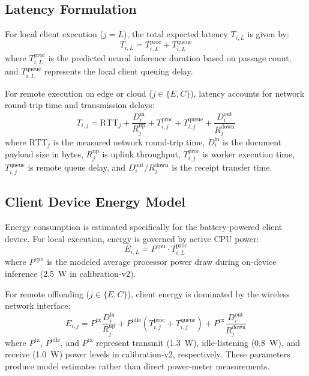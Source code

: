 \documentclass[conference]{IEEEtran}
\begin{document}
\subsection{Latency Formulation}
For local client execution ($j=L$), the total expected latency $T_{i,L}$ is given by:
\begin{equation}
  T_{i,L} = T^{\text{proc}}_{i,L} + T^{\text{queue}}_{i,L}
\end{equation}
where $T^{\text{proc}}_{i,L}$ is the predicted neural inference duration based on passage count, and $T^{\text{queue}}_{i,L}$ represents the local client queuing delay.

For remote execution on edge or cloud ($j \in \{E,C\}$), latency accounts for network round-trip time and transmission delays:
\begin{equation}
  T_{i,j} = \text{RTT}_j + \frac{D^{\text{in}}_i}{R^{\text{up}}_j} + T^{\text{proc}}_{i,j} + T^{\text{queue}}_{i,j} + \frac{D^{\text{out}}_i}{R^{\text{down}}_j}
\end{equation}
where $\text{RTT}_j$ is the measured network round-trip time, $D^{\text{in}}_i$ is the document payload size in bytes, $R^{\text{up}}_j$ is uplink throughput, $T^{\text{proc}}_{i,j}$ is worker execution time, $T^{\text{queue}}_{i,j}$ is remote queue delay, and $D^{\text{out}}_i/R^{\text{down}}_j$ is the receipt transfer time.

\subsection{Client Device Energy Model}
Energy consumption is estimated specifically for the battery-powered client device.
For local execution, energy is governed by active CPU power:
\begin{equation}
  E_{i,L} = P^{\text{cpu}} \cdot T^{\text{proc}}_{i,L}
\end{equation}
where $P^{\text{cpu}}$ is the modeled average processor power draw during on-device inference (2.5~W in calibration-v2).

For remote offloading ($j \in \{E,C\}$), client energy is dominated by the wireless network interface:
\begin{equation}
  E_{i,j} = P^{\text{tx}} \frac{D^{\text{in}}_i}{R^{\text{up}}_j} + P^{\text{idle}} \left(T^{\text{proc}}_{i,j} + T^{\text{queue}}_{i,j}\right) + P^{\text{rx}} \frac{D^{\text{out}}_i}{R^{\text{down}}_j}
\end{equation}
where $P^{\text{tx}}$, $P^{\text{idle}}$, and $P^{\text{rx}}$ represent transmit (1.3~W), idle-listening (0.8~W), and receive (1.0~W) power levels in calibration-v2, respectively. These parameters produce model estimates rather than direct power-meter measurements.
\end{document}
